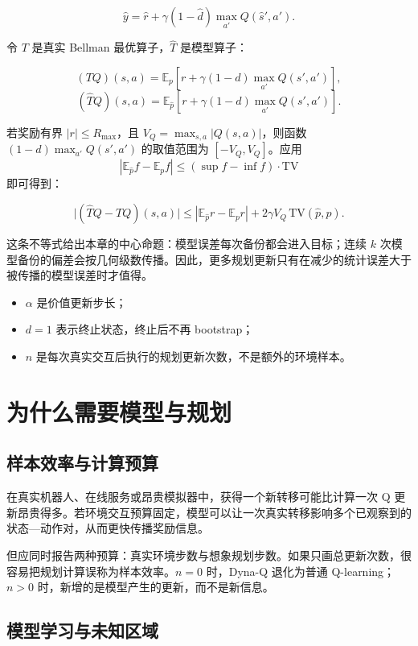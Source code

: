\documentclass{article}
\begin{document}
\[
\hat y=\hat r+\gamma(1-\hat d)\max_{a'}Q(\hat s',a').
\]

令 $T$ 是真实 Bellman 最优算子，$\hat T$ 是模型算子：

\[
(TQ)(s,a)=\mathbb E_p[r+\gamma(1-d)\max_{a'}Q(s',a')],
\]
\[
(\hat TQ)(s,a)=\mathbb E_{\hat p}[r+\gamma(1-d)\max_{a'}Q(s',a')].
\]

若奖励有界 $|r|\le R_{\max}$，且 $V_Q=\max_{s,a}|Q(s,a)|$，则函数 $(1-d)\max_{a'}Q(s',a')$ 的取值范围为 $[-V_Q,V_Q]$。应用
\[
|\mathbb E_{\hat p}f-\mathbb E_pf|\le(\sup f-\inf f)\cdot\mathrm{TV}
\]
即可得到：

\[
\bigl|(\hat TQ-TQ)(s,a)\bigr|
\le |\mathbb E_{\hat p}r-\mathbb E_pr|
+2\gamma V_Q\,\mathrm{TV}\!\left(\hat p,p\right).
\]

这条不等式给出本章的中心命题：模型误差每次备份都会进入目标；连续 $k$ 次模型备份的偏差会按几何级数传播。因此，更多规划更新只有在减少的统计误差大于被传播的模型误差时才值得。

\begin{itemize}
  \item $\alpha$ 是价值更新步长；
  \item $d=1$ 表示终止状态，终止后不再 bootstrap；
  \item $n$ 是每次真实交互后执行的规划更新次数，不是额外的环境样本。
\end{itemize}

\section*{为什么需要模型与规划}

\subsection*{样本效率与计算预算}

在真实机器人、在线服务或昂贵模拟器中，获得一个新转移可能比计算一次 Q 更新昂贵得多。若环境交互预算固定，模型可以让一次真实转移影响多个已观察到的状态—动作对，从而更快传播奖励信息。

但应同时报告两种预算：真实环境步数与想象规划步数。如果只画总更新次数，很容易把规划计算误称为样本效率。$n=0$ 时，Dyna-Q 退化为普通 Q-learning；$n>0$ 时，新增的是模型产生的更新，而不是新信息。

\subsection*{模型学习与未知区域}
\end{document}
